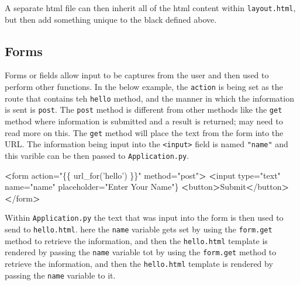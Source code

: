 \documentclass[]{book}
\newenvironment{Shaded}{\begin{snugshade}}{\end{snugshade}}
\newcommand{\StringTok}[1]{\textcolor[rgb]{0.31,0.60,0.02}{#1}}
\newcommand{\OperatorTok}[1]{\textcolor[rgb]{0.81,0.36,0.00}{\textbf{#1}}}
\newcommand{\ExtensionTok}[1]{#1}
\newcommand{\NormalTok}[1]{#1}
\begin{document}
A separate html file can then inherit all of the html content within
\texttt{layout.html}, but then add something unique to the black defined
above.

\begin{Shaded}
\end{Shaded}

\subsection{Forms}\label{forms-1}

Forms or fields allow input to be captures from the user and then used
to perform other functions. In the below example, the \texttt{action} is
being set as the route that contains teh \texttt{hello} method, and the
manner in which the information is sent is \texttt{post}. The
\texttt{post} method is different from other methods like the
\texttt{get} method where information is submitted and a result is
returned; may need to read more on this. The \texttt{get} method will
place the text from the form into the URL. The information being input
into the \texttt{\textless{}input\textgreater{}} field is named
\texttt{"name"} and this varible can be then passed to
\texttt{Application.py}.

\begin{Shaded}
\begin{Highlighting}[]
\OperatorTok{<}\ExtensionTok{form}\NormalTok{ action=}\StringTok{"\{\{ url_for('hello') \}\}"}\NormalTok{ method=}\StringTok{"post"}\OperatorTok{>}
    \OperatorTok{<}\ExtensionTok{input}\NormalTok{ type=}\StringTok{"text"}\NormalTok{ name=}\StringTok{"name"}\NormalTok{ placeholder=}\StringTok{"Enter Your Name"}\NormalTok{\}}
    \OperatorTok{<}\ExtensionTok{button}\OperatorTok{>}\NormalTok{Submit}\OperatorTok{<}\NormalTok{/button}\OperatorTok{>}
\OperatorTok{<}\NormalTok{/}\ExtensionTok{form}\OperatorTok{>}
\end{Highlighting}
\end{Shaded}

Within \texttt{Application.py} the text that was input into the form is
then used to send to \texttt{hello.html}. here the \texttt{name}
variable gets set by using the \texttt{form.get} method to retrieve the
information, and then the \texttt{hello.html} template is rendered by
passing the \texttt{name} variable tot by using the \texttt{form.get}
method to retrieve the information, and then the \texttt{hello.html}
template is rendered by passing the \texttt{name} variable to it.
\end{document}
